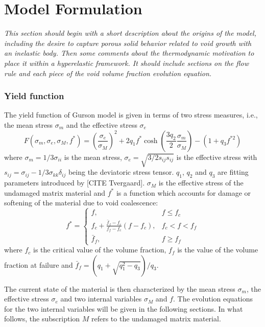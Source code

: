 \chapter{Model Formulation}
\label{model-form}

\textit{This section should begin with a short description about the
  origins of the model, including the desire to capture porous solid
  behavior related to void growth with an inelastic body. Then some
  comments about the thermodynamic motivation to place it within a
  hyperelastic framework. It should include sections on the flow rule
  and each piece of the void volume fraction evolution equation.}

\subsection{Yield function}
The yield function of Gurson model is given in terms of two stress
measures, i.e., the mean stress $\sigma_m$ and the effective stress
$\sigma_e$
\begin{equation}\label{eq:yield}
  F(\sigma_m, \sigma_e, \sigma_M, f^*) =\left(
  \frac{\sigma_e}{\sigma_M} \right)^2 + 2q_1f^* \cosh \left(
  \frac{3q_2}{2}\frac{\sigma_m}{\sigma_M}\right) - \left( 1 + q_3 f^{*
    2}\right)
\end{equation}
where $\sigma_m = 1/3\sigma_{ii}$ is the mean stress, $\sigma_e =
\sqrt{3/2s_{ij}s_{ij}}$ is the effective stress with
$s_{ij}=\sigma_{ij} - 1/3\sigma_{kk}\delta_{ij}$ being the deviatoric
stress tensor. $q_1$, $q_2$ and $q_3$ are fitting parameters
introduced by [CITE Tvergaard]. $\sigma_M$ is the effective stress of
the undamaged matrix material and $f^{*}$ is a function which accounts
for damage or softening of the material due to void coalescence:
\begin{equation}
  f^*=
  \begin{cases}
    f, & f \leq f_c \\ f_c + \frac{\bar{f}_f - f_c}{f_f - f_c} \left(
    f - f_c \right) , & f_c < f < f_f \\ \bar{f}_f, & f \geq f_f
  \end{cases}
\end{equation}
where $f_c$ is the critical value of the volume fraction, $f_f$ is the
value of the volume fraction at failure and $\bar{f}_f = (q_1 +
\sqrt{q_1^2-q_3})/q_3$.

The current state of the material is then characterized by the mean
stress $\sigma_m$, the effective stress $\sigma_e$ and two internal
variables $\sigma_M$ and $f$. The evolution equations for the two
internal variables will be given in the following sections. In what
follows, the subscription $M$ refers to the undamaged matrix material.

